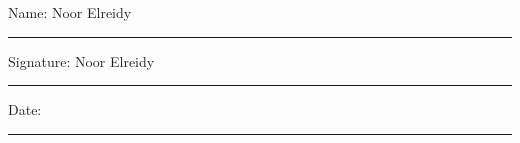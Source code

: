 \documentclass[12pt,oneside]{book}
\begin{document}
\noindent Name: Noor Elreidy\\[1mm]
\rule[1em]{25em}{0.5pt}

\noindent Signature: Noor Elreidy\\[1mm]
\rule[1em]{25em}{0.5pt}

\noindent Date:\\[1mm]
\rule[1em]{25em}{0.5pt}




\newpage
\tableofcontents
\newpage
\listoffigures
\newpage
\listoftables


\mainmatter







%  
%  
\begingroup
\vspace*{-2cm}
\printbibliography[title={References}]
\endgroup

\begin{appendices}


\end{appendices}
\end{document}
